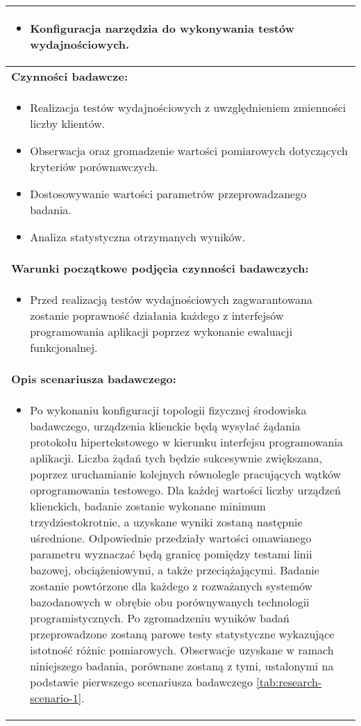 \begin{longtable}[c]{|llll|}
{\begin{itemize}
            \item Konfiguracja narzędzia do wykonywania testów wydajnościowych.
        \end{itemize}}                                                           \\ \hline
    \multicolumn{4}{|l|}{\textbf{Czynności badawcze:}}                               \\ \hline
    \multicolumn{4}{|p{\linewidth}|}{
        \begin{itemize}
            \item Realizacja testów wydajnościowych z uwzględnieniem zmienności liczby klientów.
            \item Obserwacja oraz gromadzenie wartości pomiarowych dotyczących kryteriów porównawczych.
            \item Dostosowywanie wartości parametrów przeprowadzanego badania.
            \item Analiza statystyczna otrzymanych wyników.
        \end{itemize}
    }                                                           \\ \hline
    \multicolumn{4}{|l|}{\textbf{Warunki początkowe podjęcia czynności badawczych:}} \\ \hline
    \multicolumn{4}{|p{\linewidth}|}{
        \begin{itemize}[label={}]
            \item Przed realizacją testów wydajnościowych zagwarantowana zostanie poprawność działania każdego z interfejsów programowania aplikacji poprzez wykonanie ewaluacji funkcjonalnej.
          \end{itemize}
    }                                                           \\ \hline
    \multicolumn{4}{|l|}{\textbf{Opis scenariusza badawczego:}}                      \\ \hline
    \multicolumn{4}{|p{\linewidth}|}{
        \begin{itemize}[label={}]
            \item Po wykonaniu konfiguracji topologii fizycznej środowiska badawczego, urządzenia klienckie będą wysyłać żądania protokołu hipertekstowego w kierunku interfejsu programowania aplikacji. Liczba żądań tych będzie sukcesywnie zwiększana, poprzez uruchamianie kolejnych równolegle pracujących wątków oprogramowania testowego. Dla każdej wartości liczby urządzeń klienckich, badanie zostanie wykonane minimum trzydziestokrotnie, a uzyskane wyniki zostaną następnie uśrednione. Odpowiednie przedziały wartości omawianego parametru wyznaczać będą granicę pomiędzy testami linii bazowej, obciążeniowymi, a także przeciążającymi. Badanie zostanie powtórzone dla każdego z rozważanych systemów bazodanowych w obrębie obu porównywanych technologii programistycznych. Po zgromadzeniu wyników badań przeprowadzone zostaną parowe testy statystyczne wykazujące istotność różnic pomiarowych. Obserwacje uzyskane w ramach niniejszego badania, porównane zostaną z tymi, ustalonymi na podstawie pierwszego scenariusza badawczego \ref{tab:research-scenario-1}.

\end{itemize}}
\end{longtable}
